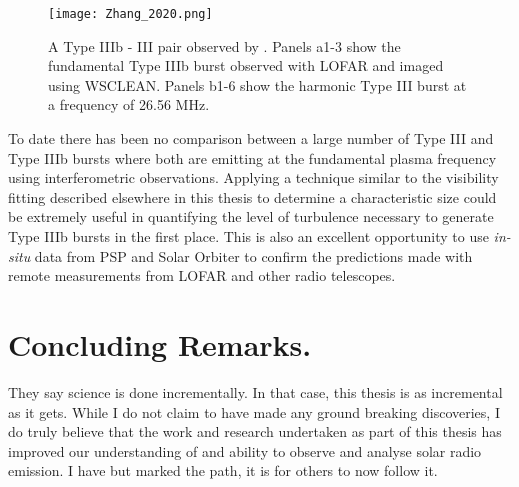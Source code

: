 \begin{figure}[ht]
\centering
\texttt{[image: Zhang\_2020.png]}
\caption[Type IIIb - III pair observed by \cite{Zhang2020}]{A Type IIIb - III pair observed by \cite{Zhang2020}. Panels a1-3 show the fundamental Type IIIb burst observed with LOFAR and imaged using WSCLEAN. Panels b1-6 show the harmonic Type III burst at a frequency of 26.56 MHz.  }
\label{fig:typeIIIbIII}
\end{figure}

To date there has been no comparison between a large number of Type III and Type IIIb bursts where both are emitting at the fundamental plasma frequency using interferometric observations. Applying a technique similar to the visibility fitting described elsewhere in this thesis to determine a characteristic size could be extremely useful in quantifying the level of turbulence necessary to generate Type IIIb bursts in the first place. This is also an excellent opportunity to use \textit{in-situ} data from PSP and Solar Orbiter to confirm the predictions made with remote measurements from LOFAR and other radio telescopes. 

\section{Concluding Remarks.}
They say science is done incrementally. In that case, this thesis is as incremental as it gets. While I do not claim to have made any ground breaking discoveries, I do truly believe that the work and research undertaken as part of this thesis has improved our understanding of and ability to observe and analyse solar radio emission.  I have but marked the path, it is for others to now follow it.